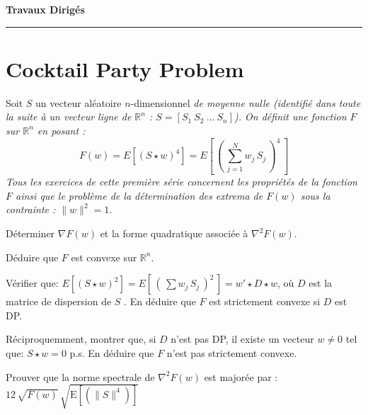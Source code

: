 \documentclass[12pt,a4paper,fleqn]{report}
\makeatletter
\def\cleardoublepage{\clearpage\if@twoside\ifodd\c@page\else\hbox{}\thispagestyle{empty}\newpage\fi\fi}
\newcommand{\R}{\mathbb R}
\newcommand{\grad}{\nabla}
\newcommand{\hess}{\nabla^2}
\newcommand{\on}{\begin{displaymath}}
\newcommand{\off}{\end{displaymath}}
\makeatother
\begin{document}
\cleardoublepage



\begin{center}

\textbf{\huge Travaux Dirig\'es }

\smallskip

\rule{10cm}{0.4pt}

\end{center}


\section{Cocktail Party Problem}

Soit $S$ un vecteur aléatoire $n$-dimensionnel  \it de moyenne nulle \rm (identifié dans toute la suite à un vecteur ligne de $\R^n$ : $S=[S_1\ S_2\ \ldots\ S_n]$).
On définit une fonction $F$ sur $\R^n$ en posant :
\on F(w)=E[(S\star w)^4]=E\left[\,\left( \,\sum_{j=1}^N w_j\,S_j\,\right)^4\,\right] \off
Tous les exercices de cette première série concernent les propriétés de  la fonction $F$ ainsi que le problème de la détermination des extrema de $F(w)$ sous la contrainte : $\|w\|^2=1$.

\begin{exercice}
\rien
\begin{questions}
\item Déterminer  $ \grad F(w)$ et  la forme quadratique associée à $\hess F(w)$.
\item Déduire que $F$ est convexe sur $\R^n$.
\item Vérifier que:
\mbox{$ E[(S\star w)^2]=E\left[\,\left( \,\sum w_j\,S_j\,\right)^2\,\right] =w'\star D\star w $},
où $D$ est la matrice de dispersion de $S$ . En déduire que $F$ est strictement convexe si  $D$ est DP.
\item Réciproquemment, montrer que, si $D$ n'est pas DP, il existe un vecteur $w\neq 0$ tel que: $S\star w=0$ p.s. En déduire que $F$ n'est pas strictement convexe.
\item Prouver que la norme spectrale de $\hess F(w)$  est majorée par :  $12\,\sqrt{F(w)}\,\sqrt{ \mbox{E} [(\| S\|^4)]}$\end{questions}
\end{exercice}
\end{document}

